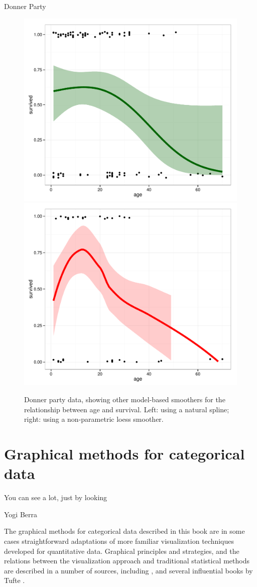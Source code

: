 \documentclass[10pt,krantz2]{krantz}\usepackage[]{graphicx}\usepackage[]{color}
\newenvironment{knitrout}{}{} %
\renewenvironment{knitrout}{\small\renewcommand{\baselinestretch}{.85}}{} %
\begin{document}
\begin{Example}[donner0]{Donner Party}
\begin{knitrout}
\color{fgcolor}\begin{figure}[!htbp]

\centerline{\includegraphics[width=.49\textwidth]{ch01/fig/donner0-other-1} 
\includegraphics[width=.49\textwidth]{ch01/fig/donner0-other-2} }

\caption[Donner party data, showing other model-based smoothers for the relationship between age and survival]{Donner party data, showing other model-based smoothers for the relationship between age and survival. Left: using a natural spline; right: using a non-parametric loess smoother.\label{fig:donner0-other}}
\end{figure}


\end{knitrout}

\end{Example}

\section{Graphical methods for categorical data}\label{sec:methods}

\epigraph{You can see a lot, just by looking}{Yogi Berra}

The graphical methods for categorical data described in this book
are in some cases straightforward adaptations of more familiar
visualization techniques developed for quantitative data.
Graphical principles and strategies, and the relations between
the visualization approach and traditional statistical methods
are described in a number of sources, including
\citet{Chambers-etal:83},
\citet{Cleveland:VisData} and several influential books by Tufte
\citep{Tufte:83,Tufte:90,Tufte:97,Tufte:2006}.
\end{document}

